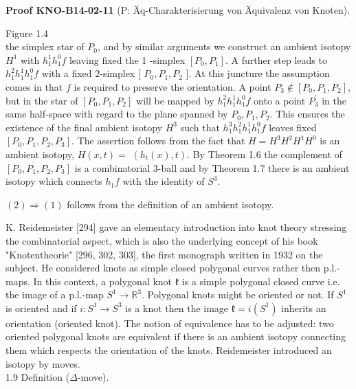 \documentclass[10pt, letterpaper]{article}
\newcommand{\CustomHeading}[3]{%
  \par\medskip\noindent%
  \textbf{#1 #2} \textnormal{(#3)}.\enskip%
}
\newenvironment{PROOF}[2]{\begin{unitbox}\CustomHeading{Proof}{#1}{#2}}{\end{unitbox}}
\begin{document}
\begin{PROOF}{KNO-B14-02-11}{P: Äq-Charakterisierung von Äquivalenz von Knoten}
Figure 1.4\\
the simplex star of $P_{0}$, and by similar arguments we construct an ambient isotopy $H^{1}$ with $h_{1}^{1} h_{1}^{0} f$ leaving fixed the 1 -simplex $\left[P_{0}, P_{1}\right]$. A further step leads to $h_{1}^{2} h_{1}^{1} h_{1}^{0} f$ with a fixed 2-simplex [ $P_{0}, P_{1}, P_{2}$ ]. At this juncture the assumption comes in that $f$ is required to preserve the orientation. A point $P_{3} \notin\left[P_{0}, P_{1}, P_{2}\right]$, but in the star of $\left[P_{0}, P_{1}, P_{2}\right]$ will be mapped by $h_{1}^{2} h_{1}^{1} h_{1}^{0} f$ onto a point $P_{3}^{\prime}$ in the same half-space with regard to the plane spanned by $P_{0}, P_{1}, P_{2}$. This ensures the existence of the final ambient isotopy $H^{3}$ such that $h_{1}^{3} h_{1}^{2} h_{1}^{1} h_{1}^{0} f$ leaves fixed $\left[P_{0}, P_{1}, P_{2}, P_{3}\right]$. The assertion follows from the fact that $H=H^{3} H^{2} H^{1} H^{0}$ is an ambient isotopy, $H(x, t)=$ $\left(h_{t}(x), t\right)$. By Theorem 1.6 the complement of $\left[P_{0}, P_{1}, P_{2}, P_{3}\right]$ is a combinatorial 3-ball and by Theorem 1.7 there is an ambient isotopy which connects $h_{1} f$ with the identity of $S^{3}$.

$(2) \Longrightarrow(1)$ follows from the definition of an ambient isotopy.\\[0pt]
\end{PROOF}


K. Reidemeister [294] gave an elementary introduction into knot theory stressing the combinatorial aspect, which is also the underlying concept of his book "Knotentheorie" [296, 302, 303], the first monograph written in 1932 on the subject. He considered knots as simple closed polygonal curves rather then p.l.-maps. In this context, a polygonal knot $\mathfrak{k}$ is a simple polygonal closed curve i.e. the image of a p.l.-map $S^{1} \rightarrow \mathbb{R}^{3}$. Polygonal knots might be oriented or not. If $S^{1}$ is oriented and if $i: S^{1} \rightarrow S^{3}$ is a knot then the image $\mathfrak{k}=i\left(S^{1}\right)$ inherits an orientation (oriented knot). The notion of equivalence has to be adjusted: two oriented polygonal knots are equivalent if there is an ambient isotopy connecting them which respects the orientation of the knots. Reidemeister introduced an isotopy by moves.\\

1.9 Definition ($\Delta$-move). 
\end{document}
